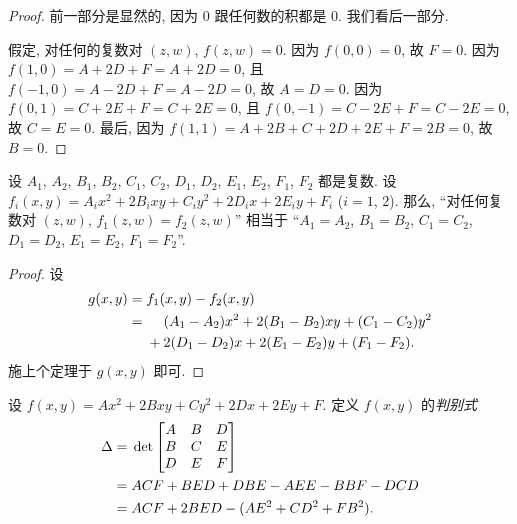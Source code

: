 \documentclass[../libro.tex]{subfiles}
\begin{document}
\begin{proof}
    前一部分是显然的, 因为 \(0\) 跟任何数的积都是 \(0\).
    我们看后一部分.

    假定, 对任何的复数对 \((z, w)\), \(f(z, w) = 0\).
    因为 \(f(0, 0) = 0\), 故 \(F = 0\).
    因为 \(f(1, 0) = A + 2D + F = A + 2D = 0\),
    且 \(f(-1, 0) = A - 2D + F = A - 2D = 0\),
    故 \(A = D = 0\).
    因为 \(f(0, 1) = C + 2E + F = C + 2E = 0\),
    且 \(f(0, -1) = C - 2E + F = C - 2E = 0\),
    故 \(C = E = 0\).
    最后, 因为
    \(f(1, 1) = A + 2B + C + 2D + 2E + F = 2B = 0\),
    故 \(B = 0\).
\end{proof}

\begin{theorem}
    设 \(A_1\), \(A_2\),
    \(B_1\), \(B_2\),
    \(C_1\), \(C_2\),
    \(D_1\), \(D_2\),
    \(E_1\), \(E_2\),
    \(F_1\), \(F_2\)
    都是复数.
    设
    \(f_i (x, y) = A_i x^2 + 2B_i xy + C_i y^2
    + 2D_i x + 2E_i y + F_i\)
    (\(i = 1\), \(2\)).
    那么,
    ``对任何复数对 \((z, w)\), \(f_1 (z, w) = f_2 (z, w)\)''
    相当于
    ``\(A_1 = A_2\), \(B_1 = B_2\), \(C_1 = C_2\),
    \(D_1 = D_2\), \(E_1 = E_2\), \(F_1 = F_2\)''.
\end{theorem}

\begin{proof}
    设
    \begin{align*}
        g(x, y)
        = {} & f_1 (x, y) - f_2 (x, y)
        \\
        = {} & \hphantom{{} + {}}
        (A_1 - A_2) x^2 + 2(B_1 - B_2) xy + (C_1 - C_2) y^2
        \\
        &
        + 2(D_1 - D_2) x + 2(E_1 - E_2) y + (F_1 - F_2).
    \end{align*}
    施上个定理于 \(g(x, y)\) 即可.
\end{proof}

\begin{definition}
    设 \(f(x, y) = Ax^2 + 2Bxy + Cy^2 + 2Dx + 2Ey + F\).
    定义 \(f(x, y)\) 的\emph{判别式}
    \begin{align*}
        \Delta
        = {} &
         \det
        \begin{bmatrix}
            A & B & D \\
            B & C & E \\
            D & E & F \\
        \end{bmatrix} 
        \\
        = {} &
        ACF + BED + DBE - AEE - BBF - DCD
        \\
        = {} &
        ACF + 2BED - (AE^2 + CD^2 + FB^2).
    \end{align*}
\end{definition}
\end{document}
